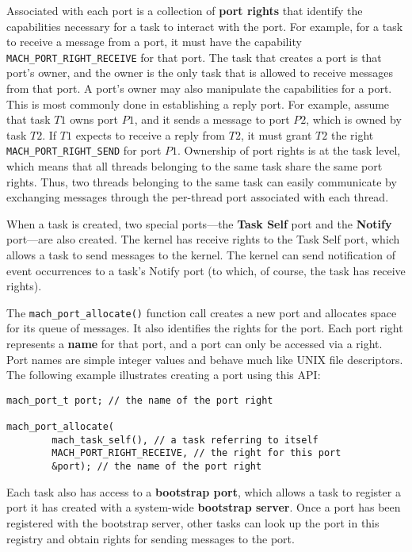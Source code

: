 Associated with each port is a collection of \textbf{port rights} that identify the capabilities necessary for a task to interact with the port. For example, for a task to receive a message from a port, it must have the capability \texttt{MACH\_PORT\_RIGHT\_RECEIVE} for that port. The task that creates a port is that port's owner, and the owner is the only task that is allowed to receive messages from that port. A port's owner may also manipulate the capabilities for a port. This is most commonly done in establishing a reply port. For example, assume that task $T1$ owns port $P1$, and it sends a message to port $P2$, which is owned by task $T2$. If $T1$ expects to receive a reply from $T2$, it must grant $T2$ the right \texttt{MACH\_PORT\_RIGHT\_SEND} for port $P1$. Ownership of port rights is at the task level, which means that all threads belonging to the same task share the same port rights. Thus, two threads belonging to the same task can easily communicate by exchanging messages through the per-thread port associated with each thread.

When a task is created, two special ports---the \textbf{Task Self} port and the \textbf{Notify} port---are also created. The kernel has receive rights to the Task Self port, which allows a task to send messages to the kernel. The kernel can send notification of event occurrences to a task's Notify port (to which, of course, the task has receive rights).

The \texttt{mach\_port\_allocate()} function call creates a new port and allocates space for its queue of messages. It also identifies the rights for the port. Each port right represents a \textbf{name} for that port, and a port can only be accessed via a right. Port names are simple integer values and behave much like UNIX file descriptors. The following example illustrates creating a port using this API:
\begin{verbatim}
mach_port_t port; // the name of the port right
 
mach_port_allocate(
        mach_task_self(), // a task referring to itself
        MACH_PORT_RIGHT_RECEIVE, // the right for this port
        &port); // the name of the port right
\end{verbatim}
Each task also has access to a \textbf{bootstrap port}, which allows a task to register a port it has created with a system-wide \textbf{bootstrap server}. Once a port has been registered with the bootstrap server, other tasks can look up the port in this registry and obtain rights for sending messages to the port.

